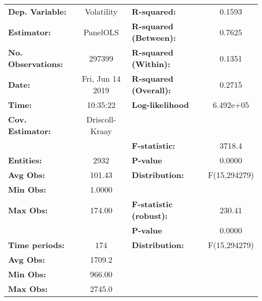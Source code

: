 \begin{center}
\begin{tabular}{lclc}
\toprule
\textbf{Dep. Variable:}                 &     Volatility     & \textbf{  R-squared:         }   &      0.1593      \\
\textbf{Estimator:}                     &      PanelOLS      & \textbf{  R-squared (Between):}  &      0.7625      \\
\textbf{No. Observations:}              &       297399       & \textbf{  R-squared (Within):}   &      0.1351      \\
\textbf{Date:}                          &  Fri, Jun 14 2019  & \textbf{  R-squared (Overall):}  &      0.2715      \\
\textbf{Time:}                          &      10:35:22      & \textbf{  Log-likelihood     }   &    6.492e+05     \\
\textbf{Cov. Estimator:}                &   Driscoll-Kraay   & \textbf{                     }   &                  \\
\textbf{}                               &                    & \textbf{  F-statistic:       }   &      3718.4      \\
\textbf{Entities:}                      &        2932        & \textbf{  P-value            }   &      0.0000      \\
\textbf{Avg Obs:}                       &       101.43       & \textbf{  Distribution:      }   &   F(15,294279)   \\
\textbf{Min Obs:}                       &       1.0000       & \textbf{                     }   &                  \\
\textbf{Max Obs:}                       &       174.00       & \textbf{  F-statistic (robust):} &      230.41      \\
\textbf{}                               &                    & \textbf{  P-value            }   &      0.0000      \\
\textbf{Time periods:}                  &        174         & \textbf{  Distribution:      }   &   F(15,294279)   \\
\textbf{Avg Obs:}                       &       1709.2       & \textbf{                     }   &                  \\
\textbf{Min Obs:}                       &       966.00       & \textbf{                     }   &                  \\
\textbf{Max Obs:}                       &       2745.0       & \textbf{                     }   &                  \\

\end{tabular}
\end{center}
